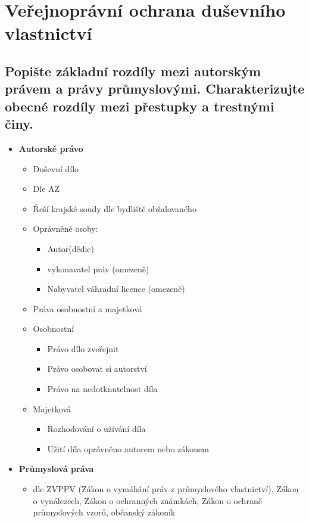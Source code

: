 
\section{Veřejnoprávní ochrana duševního vlastnictví}



\subsection{Popište základní rozdíly mezi autorským právem a právy průmyslovými. Charakterizujte obecné rozdíly mezi přestupky a trestnými činy.}
\begin{itemize}
    \item \textbf{Autorské právo}\begin{itemize}
        \item Duševní dílo
        \item Dle AZ
        \item Řeší krajské soudy dle bydliště obžalovaného
        \item Oprávněné osoby:\begin{itemize}
            \item Autor(dědic)
            \item vykonavatel práv (omezeně)
            \item Nabyvatel váhradní licence (omezeně)
        \end{itemize}
        \item Práva osobnostní a majetková
        \item Osobnostní
        \begin{itemize}
            \item Právo dílo zveřejnit
            \item Právo osobovat si autorství
            \item Právo na nedotknutelnost díla
        \end{itemize}
        \item Majetková
        \begin{itemize}
            \item Rozhodování o užívání díla
            \item Užití díla oprávněno autorem nebo zákonem
        \end{itemize}
    \end{itemize}
    \item \textbf{Průmyslová práva}\begin{itemize}
        \item dle ZVPPV (Zákon o vymáhání práv z průmyslového vlastnictví), Zákon o vynálezech, Zákon o ochranných známkách, Zákon o ochraně průmyslových vzorů, občanský zákoník

\end{itemize}
\end{itemize}
